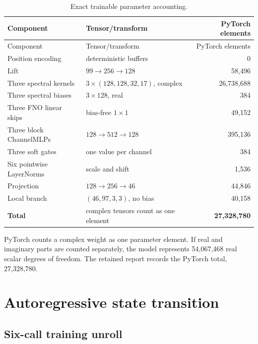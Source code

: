 \documentclass[11pt,oneside]{report}
\begin{document}
\begin{longtable}{@{}p{}p{}r@{}}
\caption{Exact trainable parameter accounting.}
\label{tab:params}\\
\toprule
Component & Tensor/transform & PyTorch elements \\
\midrule
\endfirsthead
\toprule
Component & Tensor/transform & PyTorch elements \\
\midrule
\endhead
Position encoding & deterministic buffers & 0 \\
Lift & \(99\to256\to128\) & 58,496 \\
Three spectral kernels & \(3\times(128,128,32,17)\), complex & 26,738,688 \\
Three spectral biases & \(3\times128\), real & 384 \\
Three FNO linear skips & bias-free \(1\times1\) & 49,152 \\
Three block ChannelMLPs & \(128\to512\to128\) & 395,136 \\
Three soft gates & one value per channel & 384 \\
Six pointwise LayerNorms & scale and shift & 1,536 \\
Projection & \(128\to256\to46\) & 44,846 \\
Local branch & \((46,97,3,3)\), no bias & 40,158 \\
\midrule
\textbf{Total} & complex tensors count as one element & \textbf{27,328,780} \\
\bottomrule
\end{longtable}

PyTorch counts a complex weight as one parameter element. If real and
imaginary parts are counted separately, the model represents 54,067,468 real
scalar degrees of freedom. The retained report records the PyTorch total,
27,328,780.

\chapter{Autoregressive state transition}
\label{ch:rollout}

\section{Six-call training unroll}
\end{document}
